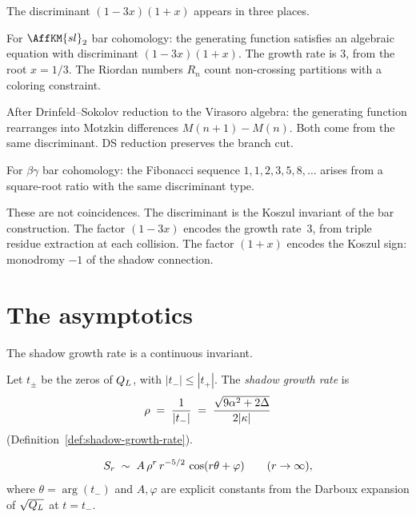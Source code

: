 \begin{example}
\label{ex:comp-three-discriminants}
The discriminant $(1-3x)(1+x)$ appears in three places.

For $\AffKM{sl}_2$ bar cohomology: the generating function
satisfies an algebraic equation with discriminant
$(1-3x)(1+x)$. The growth rate is $3$, from the root $x = 1/3$.
The Riordan numbers $R_n$ count non-crossing partitions with
a coloring constraint.

After Drinfeld--Sokolov reduction to the Virasoro algebra: the
generating function rearranges into Motzkin differences
$M(n{+}1) - M(n)$. Both come from the same discriminant.
DS reduction preserves the branch cut.

For $\beta\gamma$ bar cohomology: the Fibonacci sequence
$1, 1, 2, 3, 5, 8, \ldots$ arises from a square-root ratio
with the same discriminant type.

These are not coincidences. The discriminant is the Koszul
invariant of the bar construction. The factor $(1-3x)$
encodes the growth rate~$3$, from triple residue extraction
at each collision. The factor $(1+x)$ encodes the Koszul sign:
monodromy $-1$ of the shadow connection.
\end{example}


\section{The asymptotics}
\label{sec:comp-asymptotics}

The shadow growth rate is a continuous invariant.

\begin{definition}
\label{def:comp-shadow-growth-rate}
Let $t_\pm$ be the zeros of $Q_L$, with
$|t_-| \leq |t_+|$. The \emph{shadow growth rate} is
\begin{equation}\label{eq:comp-shadow-growth-rate}
 \rho
 \;=\; \frac{1}{|t_-|}
 \;=\; \frac{\sqrt{9\alpha^2 + 2\Delta}}{2|\kappa|}
\end{equation}
\textup{(}Definition~\textup{\ref{def:shadow-growth-rate})}.
\end{definition}

\begin{theorem}
\label{thm:comp-shadow-asymptotics}
\ClaimStatusProvedHere
\begin{equation}\label{eq:comp-shadow-asymptotics}
 S_r \;\sim\; A\, \rho^r\, r^{-5/2}\,
 \cos(r\theta + \varphi)
 \qquad (r \to \infty),
\end{equation}
where $\theta = \arg(t_-)$ and $A, \varphi$ are explicit
constants from the Darboux expansion of $\sqrt{Q_L}$
at $t = t_-$.
\end{theorem}

